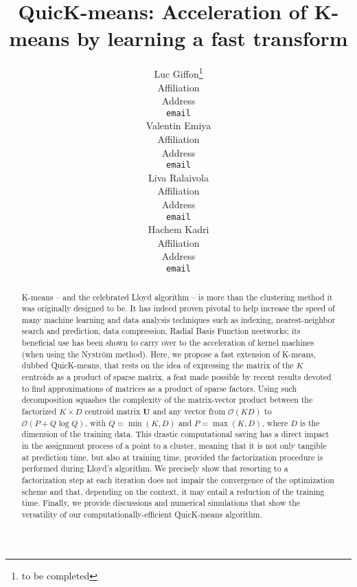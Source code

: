 \documentclass{article}
\title{QuicK-means: Acceleration of K-means by learning a fast transform}
\author{%
  Luc Giffon\thanks{to be completed} \\
  Affiliation\\
  Address\\
  \texttt{email} \\
   \And
   Valentin Emiya\\
  Affiliation\\
  Address\\
  \texttt{email} \\
   \And
   Liva Ralaivola\\
  Affiliation\\
  Address\\
  \texttt{email} \\
   \And
   Hachem Kadri\\
  Affiliation\\
  Address\\
  \texttt{email} \\
}
\begin{document}
\maketitle

\begin{abstract}
	
K-means -- and the celebrated Lloyd algorithm -- is more than the clustering method it was 
originally designed to be. It has indeed proven pivotal to help increase the speed of
many machine learning and data analysis techniques such as indexing, nearest-neighbor 
search and prediction, data compression, Radial Basis Function neetworks;
 its beneficial use has been shown to carry over to the acceleration of kernel machines 
 (when using the Nyström method). Here, we propose a fast extension of K-means, dubbed QuicK-means, 
 that rests on
the idea of expressing the matrix of the $K$ centroids
as a product of sparse matrix, a feat made possible by recent results devoted 
to find approximations of matrices as a product of sparse factors. Using such 
decomposition squashes the complexity of the matrix-vector product between
the factorized $K \times D$ centroid matrix $\mathbf{U}$ and any vector from
$\mathcal{O}(KD)$ to $\mathcal{O}(P+Q \log Q)$, with $Q=\min (K, D)$ and $P=\max (K, D)$,
where $D$ is the dimension of the training data. This drastic computational saving
has a direct impact in the assignment process of a point to a cluster, 
meaning that it is not only tangible at prediction time, but also at training time,
provided the factorization procedure is performed during Lloyd's algorithm.
We precisely show that resorting to a factorization step at each iteration does not 
impair the convergence of the optimization scheme and that, depending on the context, 
it may entail a reduction of the training time. Finally, we provide discussions and numerical
 simulations that show the versatility of our computationally-efficient QuicK-means algorithm.




\end{abstract}
\end{document}
